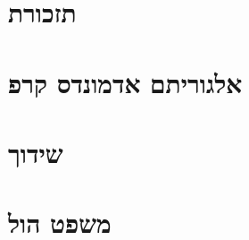 \documentclass[]{article}
\def\lecnum{12}
\def\insert#1{}
\begin{document}

\section*{תזכורת}
\insert{remainder}

\section*{אלגוריתם אדמונדס קרפ}
\insert{edmonds}

\section*{שידוך}
\insert{matching}

\section*{משפט הול}
\insert{hall}
\end{document}
